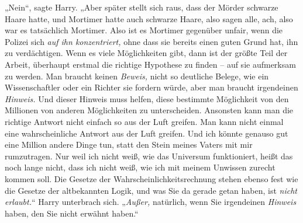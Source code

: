„Nein“, sagte Harry. „Aber später stellt sich raus, dass der Mörder schwarze Haare hatte, und Mortimer hatte auch schwarze Haare, also sagen alle, ach, also war es tatsächlich Mortimer. Also ist es Mortimer gegenüber unfair, wenn die Polizei sich \emph{auf ihn konzentriert,} ohne dass sie bereits einen guten Grund hat, ihn zu verdächtigen. Wenn es viele Möglichkeiten gibt, dann ist der größte Teil der Arbeit, überhaupt erstmal die richtige Hypothese zu finden – auf sie aufmerksam zu werden. Man braucht keinen \emph{Beweis,} nicht so deutliche Belege, wie ein Wissenschaftler oder ein Richter sie fordern würde, aber man braucht irgendeinen \emph{Hinweis.} Und dieser Hinweis muss helfen, diese bestimmte Möglichkeit von den Millionen von anderen Möglichkeiten zu unterscheiden. Ansonsten kann man die richtige Antwort nicht einfach so aus der Luft greifen. Man kann nicht einmal eine wahrscheinliche Antwort aus der Luft greifen. Und ich könnte genauso gut eine Million andere Dinge tun, statt den Stein meines Vaters mit mir rumzutragen. Nur weil ich nicht weiß, wie das Universum funktioniert, heißt das noch lange nicht, dass ich nicht weiß, wie ich mit meinem Unwissen zurecht kommen soll. Die Gesetze der Wahrscheinlichkeitsrechnung stehen ebenso fest wie die Gesetze der altbekannten Logik, und was Sie da gerade getan haben, ist \emph{nicht erlaubt.}“ Harry unterbrach sich. „\emph{Außer,} natürlich, wenn Sie irgendeinen \emph{Hinweis} haben, den Sie nicht erwähnt haben.“

